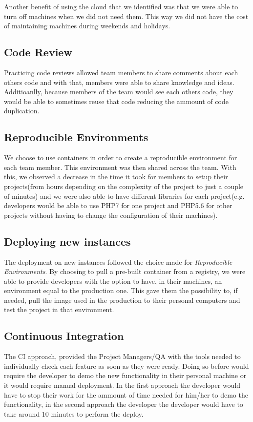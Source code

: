 \documentclass{llncs}
\begin{document}
  Another benefit of using the cloud that we identified was that we were able to turn off machines when we did not need them. This way we did not have the cost of maintaining machines during weekends and holidays.

  \subsection{Code Review}
  Practicing code reviews allowed team members to share comments about each others code and with that, members were able to share knowledge and ideas. Additioanlly, because members of the team would see each others code, they would be able to sometimes reuse that code reducing the ammount of code duplication.

  \subsection{Reproducible Environments}
  We choose to use containers in order to create a reproducible environment for each team member. This environment was then shared across the team. With this, we observed a decrease in the time it took for members to setup their projects(from hours depending on the complexity of the project to just a couple of minutes) and we were also able to have different libraries for each project(e.g. developers would be able to use PHP7 for one project and PHP5.6 for other projects without having to change the configuration of their machines).

  \subsection{Deploying new instances}
  The deployment on new instances followed the choice made for \textit{Reproducible Environments}. By choosing to pull a pre-built container from a registry, we were able to provide developers with the option to have, in their machines, an environment equal to the production one. This gave them the possibility to, if needed, pull the image used in the production to their personal computers and test the project in that environment.

  \subsection{Continuous Integration}

  The CI approach, provided the Project Managers/QA with the tools needed to individually check each feature as soon as they were ready. Doing so before would require the developer to demo the new functionality in their personal machine or it would require manual deployment. In the first approach the developer would have to stop their work for the ammount of time needed for him/her to demo the functionality, in the second approach the developer the developer would have to take around 10 minutes to perform the deploy.
\end{document}

